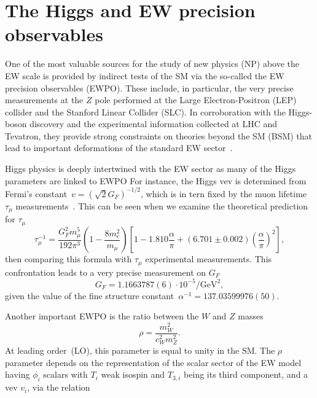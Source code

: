 \section{The Higgs and EW precision observables}
One of the most valuable sources for the study of new physics (NP) above the EW scale is provided by indirect tests of the SM via the so-called the EW precision observables (EWPO). These include, in particular, the very precise measurements at the $Z$ pole performed at the Large Electron-Positron (LEP) collider and the Stanford Linear Collider (SLC). In corroboration with the Higgs-boson discovery and the experimental information collected at LHC and Tevatron, they provide strong constraints on theories beyond the SM (BSM) that lead to important deformations of the standard EW sector~\cite{Falkowski:2013dza,Ciuchini:2013pca,Falkowski:2014tna,deBlas:2015aea,deBlas:2016ojx,deBlas:2017wmn,Haller:2018nnx,Ellis:2018gqa,Erler:2019hds,Dawson:2020oco}.
\par Higgs physics is deeply intertwined with the EW sector as many of the Higgs parameters are linked to EWPO For instance, the Higgs vev is determined from Fermi's constant~$v =(\sqrt{2}G_F)^{-1/2}$, which is in tern fixed by the muon lifetime~$ \tau_\mu$ measurements~\cite{PhysRev.101.866,PhysRev.113.1652,Mohammad:1976qd,PhysRevLett.82.488}. This can be seen when we examine the theoretical prediction for $ \tau_\mu$ 
\begin{equation}
    \tau_\mu^{-1} = \frac{G_F^2 m_\mu^5}{192\pi^3}\left(1-\frac{8 m_e^2}{m_\mu}\right) \left[1-1.810\frac{\alpha}{\pi}+(6.701\pm0.002)\left(\frac{\alpha}{\pi}\right)^2\right],
\end{equation}
then comparing this formula with $ \tau_\mu$  experimental measurements. This confrontation leads to a very precise measurement on $G_F$~\cite{Zyla:2020zbs}
\begin{equation}
    G_F=1.1663787(6) \cdot 10^{-5} \si{\per\GeV\squared},
\end{equation}
given the value of the fine structure constant~$\alpha^{-1} =137.03599976 (50)$. 
\par Another important EWPO is the ratio between the $W$ and $Z$ masses
\begin{equation}
    \rho = \frac{m_W^2}{c_W^2m_Z^2}.
\end{equation}
At leading order~(LO), this parameter is equal to unity in the SM. The $\rho$ parameter depends on the representation of the scalar sector of the EW model having $\phi_i$ scalars with $T_i$ weak isospin and $T_{3,i}$ being its third component, and a vev $v_i$, via the relation~\cite{ROSS1975135,Djouadi:2005gi}
